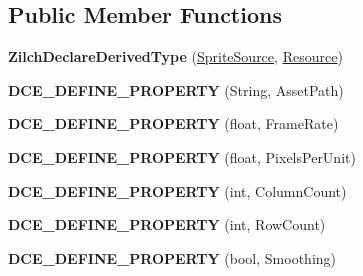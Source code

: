 \subsection*{Public Member Functions}
\begin{DoxyCompactItemize}
\item 
\hypertarget{classDCEngine_1_1SpriteSource_acb17958731a1664b973a3f57f53ed7a8}{{\bfseries Zilch\-Declare\-Derived\-Type} (\hyperlink{classDCEngine_1_1SpriteSource}{Sprite\-Source}, \hyperlink{classDCEngine_1_1Resource}{Resource})}\label{classDCEngine_1_1SpriteSource_acb17958731a1664b973a3f57f53ed7a8}

\item 
\hypertarget{classDCEngine_1_1SpriteSource_aec39a7aa0d3a8f62f7ed94b320b9b22f}{{\bfseries D\-C\-E\-\_\-\-D\-E\-F\-I\-N\-E\-\_\-\-P\-R\-O\-P\-E\-R\-T\-Y} (String, Asset\-Path)}\label{classDCEngine_1_1SpriteSource_aec39a7aa0d3a8f62f7ed94b320b9b22f}

\item 
\hypertarget{classDCEngine_1_1SpriteSource_a3984408225137116e487619887349dbe}{{\bfseries D\-C\-E\-\_\-\-D\-E\-F\-I\-N\-E\-\_\-\-P\-R\-O\-P\-E\-R\-T\-Y} (float, Frame\-Rate)}\label{classDCEngine_1_1SpriteSource_a3984408225137116e487619887349dbe}

\item 
\hypertarget{classDCEngine_1_1SpriteSource_aacb6f248517c20520b012ca728b30c10}{{\bfseries D\-C\-E\-\_\-\-D\-E\-F\-I\-N\-E\-\_\-\-P\-R\-O\-P\-E\-R\-T\-Y} (float, Pixels\-Per\-Unit)}\label{classDCEngine_1_1SpriteSource_aacb6f248517c20520b012ca728b30c10}

\item 
\hypertarget{classDCEngine_1_1SpriteSource_a04ab9da47b15509de595af4b3d5c52af}{{\bfseries D\-C\-E\-\_\-\-D\-E\-F\-I\-N\-E\-\_\-\-P\-R\-O\-P\-E\-R\-T\-Y} (int, Column\-Count)}\label{classDCEngine_1_1SpriteSource_a04ab9da47b15509de595af4b3d5c52af}

\item 
\hypertarget{classDCEngine_1_1SpriteSource_a2e68862e8bd958aa713808d4c747b7e8}{{\bfseries D\-C\-E\-\_\-\-D\-E\-F\-I\-N\-E\-\_\-\-P\-R\-O\-P\-E\-R\-T\-Y} (int, Row\-Count)}\label{classDCEngine_1_1SpriteSource_a2e68862e8bd958aa713808d4c747b7e8}

\item 
\hypertarget{classDCEngine_1_1SpriteSource_a9b40d9edc23ae145bf3b84f553bad8f3}{{\bfseries D\-C\-E\-\_\-\-D\-E\-F\-I\-N\-E\-\_\-\-P\-R\-O\-P\-E\-R\-T\-Y} (bool, Smoothing)}\label{classDCEngine_1_1SpriteSource_a9b40d9edc23ae145bf3b84f553bad8f3}


\end{DoxyCompactItemize}
